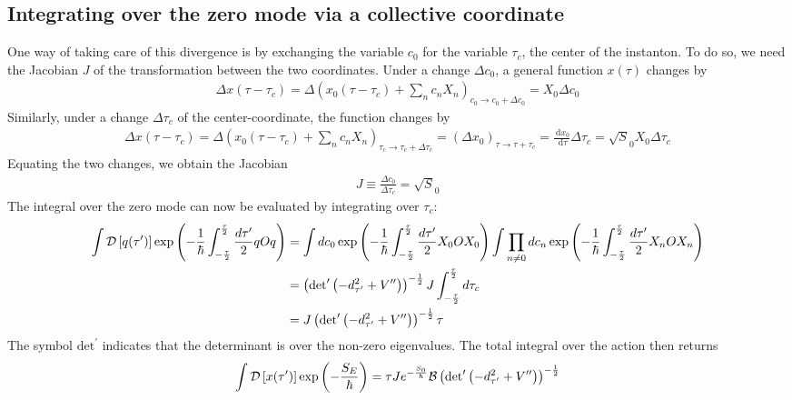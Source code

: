 \documentclass[12pt]{article}
\begin{document}
\subsection*{Integrating over the zero mode via a collective coordinate}
One way of taking care of this divergence is by exchanging the variable \(c_0\) for the variable \(\tau_c\), the center of the instanton. To do so, we need the Jacobian \(J\) of the transformation between the two coordinates. Under a change \(\Delta c_0\), a general function \(x(\tau)\) changes by
\begin{equation}\begin{aligned}
	\Delta x(\tau - \tau_c) = \Delta \left( x_0(\tau - \tau_c) + \sum_n c_n X_n \right)_{c_0 \to c_0 + \Delta c_0} = X_0 \Delta c_0
\end{aligned}\end{equation}
Similarly, under a change \(\Delta \tau_c\) of the center-coordinate, the function changes by
\begin{equation}\begin{aligned}
	\Delta x(\tau - \tau_c) = \Delta \left( x_0(\tau - \tau_c) + \sum_n c_n X_n \right)_{\tau_c \to \tau_c + \Delta \tau_c} = \left(\Delta x_0\right)_{\tau \to \tau + \tau_c} = \frac{\:\mathrm{d}x_0}{\:\mathrm{d}\tau}\Delta \tau_c = \sqrt S_0 X_0 \Delta \tau_c
\end{aligned}\end{equation}
Equating the two changes, we obtain the Jacobian 
\begin{equation}\begin{aligned}
J \equiv \frac{\Delta c_0}{\Delta \tau_c} = \sqrt S_0
\end{aligned}\end{equation}
The integral over the zero mode can now be evaluated by integrating over \(\tau_c\):
\begin{equation}\begin{aligned}
	\int \mathcal{D}\left[{q(\tau^\prime)}\right]\exp\left({-\frac{1}{\hbar}\int_{-\frac{\tau}{2}}^{\frac{\tau}{2}} \frac{d\tau^\prime}{2} q O q}\right) &= \int dc_0 \exp\left({-\frac{1}{\hbar}\int_{-\frac{\tau}{2}}^{\frac{\tau}{2}} \frac{d\tau^\prime}{2} X_0 O X_0}\right) \int \prod_{n \neq 0}dc_n \exp\left({-\frac{1}{\hbar}\int_{-\frac{\tau}{2}}^{\frac{\tau}{2}} \frac{d\tau^\prime}{2} X_n O X_n}\right)\\
															     &= \left(\text{det}^\prime\left({-d^2_{\tau^\prime}+V^{\prime\prime}}\right)\right)^{-\frac{1}{2}}J\int_{-\frac{\tau}{2}}^{\frac{\tau}{2}} d\tau_c \\
															     &= J\left(\text{det}^\prime\left({-d^2_{\tau^\prime}+V^{\prime\prime}}\right)\right)^{-\frac{1}{2}} \tau
\end{aligned}\end{equation}
The symbol \(\text{det}^\prime\) indicates that the determinant is over the non-zero eigenvalues. The total integral over the action then returns
\begin{equation}\begin{aligned}
	\int \mathcal{D}\left[{x(\tau^\prime)}\right]\exp\left({-\frac{S_E}{\hbar}}\right) =  \tau J e^{-\frac{S_0}{\hbar}} \mathcal{B} \left(\text{det}^\prime\left({-d^2_{\tau^\prime}+V^{\prime\prime}}\right)\right)^{-\frac{1}{2}}
\end{aligned}\end{equation}
\end{document}
